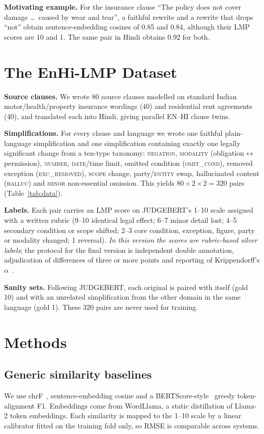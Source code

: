 \textbf{Motivating example.} For the insurance clause ``The policy does not cover damage \ldots\ caused by wear and tear'', a faithful rewrite and a rewrite that drops ``not'' obtain sentence-embedding cosines of 0.85 and 0.84, although their LMP scores are 10 and 1. The same pair in Hindi obtains 0.92 for both.

\section{The EnHi-LMP Dataset}
\textbf{Source clauses.} We wrote 80 source clauses modelled on standard Indian motor/health/property insurance wordings (40) and residential rent agreements (40), and translated each into Hindi, giving parallel EN--HI clause twins.

\textbf{Simplifications.} For every clause and language we wrote one faithful plain-language simplification and one simplification containing exactly one legally significant change from a ten-type taxonomy: \textsc{negation}, \textsc{modality} (obligation$\leftrightarrow$permission), \textsc{number}, \textsc{date}/time limit, omitted condition (\textsc{omit\_cond}), removed exception (\textsc{exc\_removed}), \textsc{scope} change, party/\textsc{entity} swap, hallucinated content (\textsc{halluc}) and \textsc{minor} non-essential omission. This yields $80\times2\times2=320$ pairs (Table~\ref{tab:data}).

\textbf{Labels.} Each pair carries an LMP score on JUDGEBERT's 1--10 scale assigned with a written rubric (9--10 identical legal effect; 6--7 minor detail lost; 4--5 secondary condition or scope shifted; 2--3 core condition, exception, figure, party or modality changed; 1 reversal). \emph{In this version the scores are rubric-based silver labels}; the protocol for the final version is independent double annotation, adjudication of differences of three or more points and reporting of Krippendorff's $\alpha$~\cite{kripp}.

\textbf{Sanity sets.} Following JUDGEBERT, each original is paired with itself (gold 10) and with an unrelated simplification from the other domain in the same language (gold 1). These 320 pairs are never used for training.

\section{Methods}
\subsection{Generic similarity baselines}
We use chrF~\cite{chrf}, sentence-embedding cosine and a BERTScore-style~\cite{bertscore} greedy token-alignment F1. Embeddings come from WordLlama, a static distillation of Llama-2 token embeddings. Each similarity is mapped to the 1--10 scale by a linear calibrator fitted on the training fold only, so RMSE is comparable across systems.

